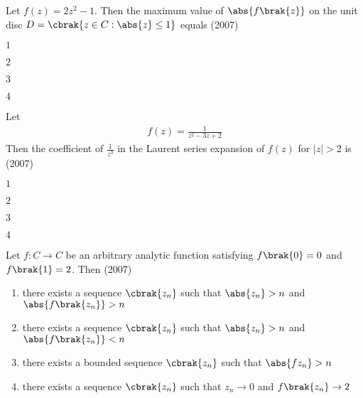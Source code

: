 \iffalse
\chapter{2007}
\author{AI24BTECH11004}
\section{ma}
\fi

	\item Let $f(z)=2 z^{2}-1$. Then the maximum value of $\abs{f\brak{z}}$ on the unit disc $D=\cbrak{z \in C:\abs{z} \leq 1}$ equals
	\hfill{(2007)}
	       \begin{enumerate}
             \begin{multicols}{4}  
		       \item $1$
		       \item $2$
		       \item $3$
		       \item $4$
             \end{multicols}
        	\end{enumerate}	
	\item Let 
             \begin{align*}  
		f(z)=\frac{1}{z^{2}-3 z+2}
              \end{align*}
	         Then the coefficient of $\frac{1}{z^{3}}$ in the Laurent series expansion of $f(z)$ for $|z|>2$ is
	         \hfill{(2007)}
               \begin{enumerate}
			        \begin{multicols}{4}  
		       \item $1$
		       \item $2$
		       \item $3$
		       \item $4$
                    \end{multicols}   
	       \end{enumerate}	
       \item Let $f: C \rightarrow C$ be an arbitrary analytic function satisfying $f\brak{0}=0$ and $f\brak{1}=2$. Then
       \hfill{(2007)}
		\begin{enumerate}
			\item there exists a sequence $\cbrak{z_{n}}$ such that $\abs{z_{n}}>n$ and $\abs{f\brak{z_{n}}}>n$
			\item there exists a sequence $\cbrak{z_{n}}$ such that $\abs{z_{n}}>n$ and $\abs{f\brak{z_{n}}}<n$
			\item there exists a bounded sequence $\cbrak{z_{n}}$ such that $\abs{f{z_{n}}}>n$
			\item there exists a sequence $\cbrak{z_{n}}$ such that $z_{n} \rightarrow 0$ and $f\brak{z_{n}} \rightarrow 2$
		\end{enumerate}
